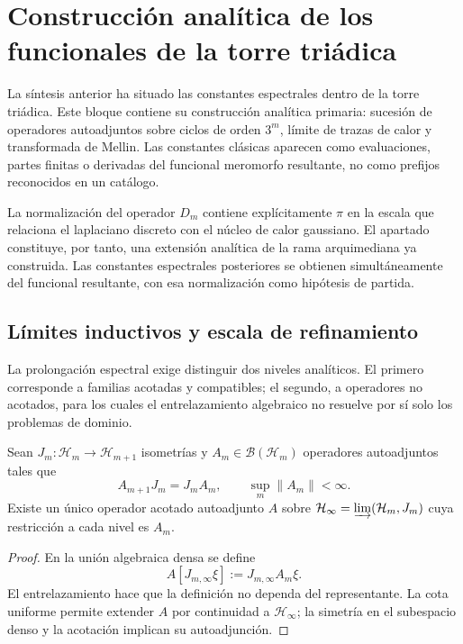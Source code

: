 \chapter{Construcción analítica de los funcionales de la torre triádica}
\label{chap:funcionales-espectrales-triadicos}

La síntesis anterior ha situado las constantes espectrales dentro de la
torre triádica. Este bloque contiene su construcción analítica primaria:
sucesión de operadores autoadjuntos sobre ciclos de orden \(3^m\), límite de
trazas de calor y transformada de Mellin. Las constantes clásicas aparecen
como evaluaciones, partes finitas o derivadas del funcional meromorfo
resultante, no como prefijos reconocidos en un catálogo.

La normalización del operador $D_m$ contiene explícitamente $\pi$ en la escala
que relaciona el laplaciano discreto con el núcleo de calor gaussiano. El
apartado constituye, por tanto, una extensión analítica de la rama
arquimediana ya construida. Las constantes espectrales posteriores se obtienen
simultáneamente del funcional resultante, con esa normalización como hipótesis
de partida.

\section{Límites inductivos y escala de refinamiento}

La prolongación espectral exige distinguir dos niveles analíticos. El
primero corresponde a familias acotadas y compatibles; el segundo, a
operadores no acotados, para los cuales el entrelazamiento algebraico no
resuelve por sí solo los problemas de dominio.

\begin{theorem}
\label{pf84:E03-06}
Sean \(J_m:\mathcal H_m\to\mathcal H_{m+1}\) isometrías y
\(A_m\in\mathcal B(\mathcal H_m)\) operadores autoadjuntos tales que
\[
 A_{m+1}J_m=J_mA_m,
 \qquad
 \sup_m\lVert A_m\rVert<\infty.
\]
Existe un único operador acotado autoadjunto \(A\) sobre
\(\mathcal H_\infty=\varinjlim(\mathcal H_m,J_m)\) cuya restricción a cada
nivel es \(A_m\).
\end{theorem}

\begin{proof}
En la unión algebraica densa se define
\[
 A[J_{m,\infty}\xi]:=J_{m,\infty}A_m\xi.
\]
El entrelazamiento hace que la definición no dependa del representante. La
cota uniforme permite extender \(A\) por continuidad a
\(\mathcal H_\infty\); la simetría en el subespacio denso y la acotación
implican su autoadjunción.
\end{proof}

